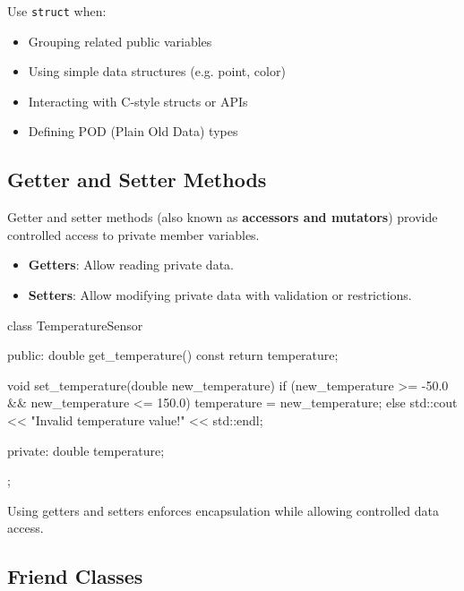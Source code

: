 \vspace{0.5em}

Use \texttt{struct} when:
\vspace{0.5em}
\begin{itemize}
    \item Grouping related public variables
    \item Using simple data structures (e.g. point, color)
    \item Interacting with C-style structs or APIs
    \item Defining POD (Plain Old Data) types
\end{itemize}

\subsection{Getter and Setter Methods}

Getter and setter methods (also known as \textbf{accessors and mutators}) provide controlled access to private member variables.

\begin{itemize}
    \item \textbf{Getters}: Allow reading private data.
    \item \textbf{Setters}: Allow modifying private data with validation or restrictions.
\end{itemize}

\begin{exampleblock}
\begin{codeblock}[language=C++]
class TemperatureSensor {
public:
    double get_temperature() const {
        return temperature;
    }

    void set_temperature(double new_temperature) {
        if (new_temperature >= -50.0 && new_temperature <= 150.0) {
            temperature = new_temperature;
        } else {
            std::cout << "Invalid temperature value!" << std::endl;
        }
    }

private:
    double temperature;
};
\end{codeblock}
\end{exampleblock}

Using getters and setters enforces encapsulation while allowing controlled data access.

\subsection{Friend Classes}

